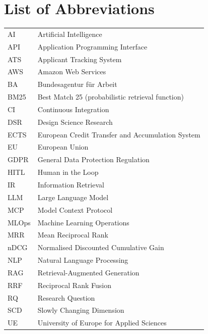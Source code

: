 \documentclass[12pt,a4paper,oneside]{report}
\begin{document}
\chapter*{List of Abbreviations}
\begin{tabular}{@{}ll@{}}
AI    & Artificial Intelligence \\
API   & Application Programming Interface \\
ATS   & Applicant Tracking System \\
AWS   & Amazon Web Services \\
BA    & Bundesagentur f\"ur Arbeit \\
BM25  & Best Match 25 (probabilistic retrieval function) \\
CI    & Continuous Integration \\
DSR   & Design Science Research \\
ECTS  & European Credit Transfer and Accumulation System \\
EU    & European Union \\
GDPR  & General Data Protection Regulation \\
HITL  & Human in the Loop \\
IR    & Information Retrieval \\
LLM   & Large Language Model \\
MCP   & Model Context Protocol \\
MLOps & Machine Learning Operations \\
MRR   & Mean Reciprocal Rank \\
nDCG  & Normalised Discounted Cumulative Gain \\
NLP   & Natural Language Processing \\
RAG   & Retrieval-Augmented Generation \\
RRF   & Reciprocal Rank Fusion \\
RQ    & Research Question \\
SCD   & Slowly Changing Dimension \\
UE    & University of Europe for Applied Sciences \\
\end{tabular}

\clearpage
\listoftables
{}

\clearpage
\listoffigures
{}

\clearpage
\end{document}
